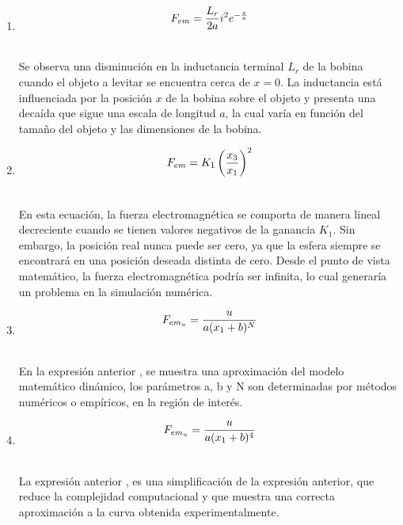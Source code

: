 \begin{enumerate}
    \item {
        \begin{align*}
        &F_{em}=\frac{L_{r}}{2a}i^2e^{-\frac{x}{a}} \\ \thinspace
    \end{align*} 


    Se observa una disminución en la inductancia terminal $L_{r}$ de la bobina cuando el objeto a levitar se encuentra cerca de $x=0$. La inductancia está influenciada por la posición $x$ de la bobina sobre el objeto  y presenta una decaída que sigue una escala de longitud $a$, la cual varía en función del tamaño del objeto y las dimensiones de la bobina.
            
            }
    
    \item {
        \begin{align*}
        &F_{em}=K_{1}\left(\frac{x_{3}}{x_{1}}\right)^2 \\ \thinspace
    \end{align*} 

    En esta ecuación, la fuerza electromagnética se comporta de manera lineal decreciente cuando se tienen valores negativos de la ganancia $K_{1}$. Sin embargo, la posición real nunca puede ser cero, ya que la esfera siempre se encontrará en una posición deseada distinta de cero. Desde el punto de vista matemático, la fuerza electromagnética podría ser infinita, lo cual generaría un problema en la simulación numérica. 

            }

    \item {
        \begin{align*}
        &F_{em_{u}}=\frac{u}{a(x_{1}+b)^N} \\ \thinspace
    \end{align*} 
    
    En la expresión anterior \cite{naz}, se muestra una aproximación del modelo matemático dinámico, los parámetros a, b y N son determinadas por métodos numéricos o empíricos, en la región de interés. 
          
          }

     \item {
        \begin{align*}
        &F_{em_{u}}=\frac{u}{a(x_{1}+b)^4} \\ \thinspace
    \end{align*} 
    
    La expresión anterior \cite{maaz}\cite{730}, es una simplificación de la expresión anterior, que reduce la complejidad computacional y que muestra una correcta aproximación a la curva obtenida experimentalmente. 
    
          }

\end{enumerate}



